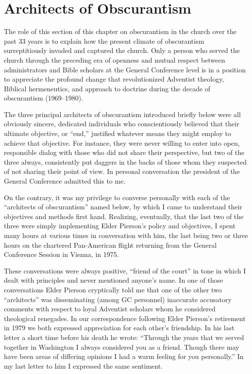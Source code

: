 \section{Architects of Obscurantism}

The role of this section of this chapter on obscurantism in the church over the
past 33 years is to explain how the present climate of obscurantism
surreptitiously invaded and captured the church. Only a person who served
the church through the preceding era of openness and mutual respect between
administrators and Bible scholars at the General Conference level is in a
position to appreciate the profound change that revolutionized Adventist
theology, Biblical hermeneutics, and approach to doctrine during the decade
of obscurantism (1969--1980).

The three principal architects of obscurantism introduced briefly below were
all obviously sincere, dedicated individuals who conscientiously believed
that their ultimate objective, or ``end,'' justified whatever means they might
employ to achieve that objective. For instance, they were never willing to
enter into open, responsible dialog with those who did not share their
perspective, but two of the three always, consistently put daggers in the
backs of those whom they suspected of not sharing their point of view. In
personal conversation the president of the General Conference admitted this
to me.

On the contrary, it was my privilege to converse personally with each of the
``architects of obscurantism'' named below, by which I came to understand
their objectives and methods first hand. Realizing, eventually, that the
last two of the three were simply implementing Elder Pierson's policy and
objectives, I spent many hours at various times in conversation with him,
the last being two or three hours on the chartered Pan-American flight
returning from the General Conference Session in Vienna, in 1975.

These conversations were always positive, ``friend of the court'' in tone in
which I dealt with principles and never mentioned anyone's name. In one of
those conversations Elder Pierson cryptically told me that one of the other
two ``architects'' was disseminating (among GC personnel) inaccurate
accusatory comments with respect to loyal Adventist scholars whom he
considered theological renegades. In our correspondence following Elder
Pierson's retirement in 1979 we both expressed appreciation for each other's
friendship. In his last letter a short time before his death he wrote:
``Through the years that we served together in Washington I always considered
you as a friend. Though there may have been areas of differing opinions I
had a warm feeling for you personally.'' In my last letter to him I expressed
the same sentiment.

